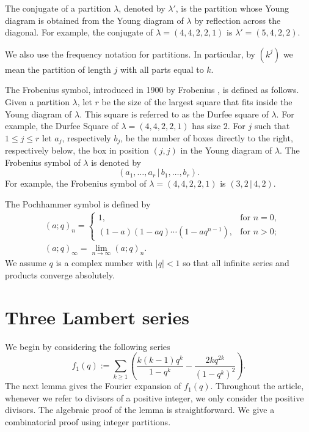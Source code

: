 \documentclass[a4paper,reqno,12pt]{amsart}
\begin{document}
The conjugate of a partition $\lambda$, denoted by $\lambda'$, is the partition whose Young diagram  is obtained from the Young diagram of $\lambda$ by reflection across the diagonal. For example, the conjugate of $\lambda=(4,4,2,2,1)$ is $\lambda'=(5,4,2,2)$. 

We also use the frequency notation for partitions. In particular, by $(k^j)$ we mean the partition of length $j$ with all parts equal to $k$.


The Frobenius symbol, introduced in 1900 by Frobenius \cite{Frobenius}, is defined as follows. Given a partition $\lambda$, let $r$ be the size of the largest square that fits inside the Young diagram of $\lambda$. This square is referred to as the Durfee square of $\lambda$. For example, the Durfee Square of $\lambda=(4,4,2,2,1)$ has size $2$. For $j$ such that $1\leq j\leq r$ let $a_j$, respectively $b_j$, be the number of boxes directly to the right, respectively below, the box in position $(j,j)$ in the Young diagram of $\lambda$. The Frobenius symbol of $\lambda$ is denoted by
$$(a_1,\dots,a_r\, \vert\,  b_1,\dots,b_r).$$
For example, the Frobenius symbol of $\lambda=(4,4,2,2,1)$ is $(3,2 \, \vert \, 4,2)$.



The Pochhammer symbol is defined by \begin{align*}
& (a;q)_n = \begin{cases}
1, & \text{for $n=0$,}\\
(1-a)(1-aq)\cdots(1-aq^{n-1}), &\text{for $n>0$;}
\end{cases}\\
& (a;q)_\infty = \lim_{n\to\infty} (a;q)_n.
\end{align*}
We assume $q$ is a complex number with $|q| < 1$ so that all infinite series and products converge absolutely. 



\section{Three Lambert series} \label{S1}


\noindent
We begin by considering the following series
\begin{equation} \label{f1} f_1(q):=\sum_{k\geq1} \left(\frac{k(k-1)q^k}{1-q^k}-\frac{2kq^{2k}}{(1-q^k)^2}\right).\end{equation}
The next lemma gives the Fourier expansion of $f_1(q)$. Throughout the article, whenever we refer to divisors of a positive integer, we only consider the positive divisors. The algebraic proof of the lemma is straightforward. We give a combinatorial proof using integer partitions. 
\end{document}
